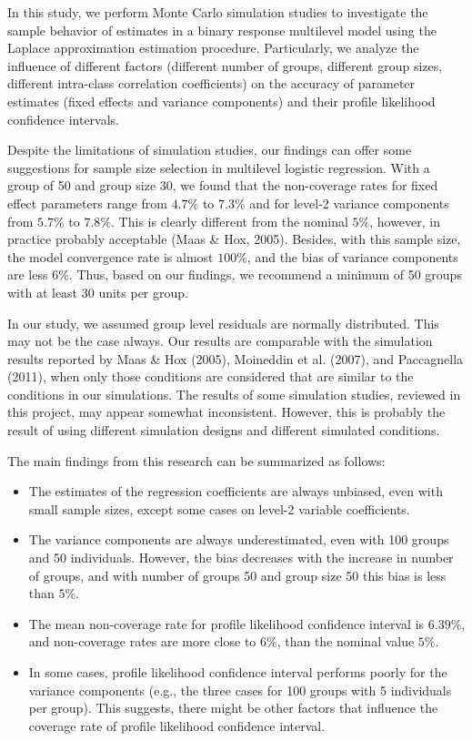 \documentclass[12pt,oneside,a4paper]{reedthesis}
\begin{document}
In this study, we perform Monte Carlo simulation studies to investigate the sample behavior of estimates in a binary response multilevel model using the Laplace approximation estimation procedure. Particularly, we analyze the influence of different factors (different number of groups, different group sizes, different intra-class correlation coefficients) on the accuracy of parameter estimates (fixed effects and variance components) and their profile likelihood confidence intervals.

Despite the limitations of simulation studies, our findings can offer some suggestions for sample size selection in multilevel logistic regression. With a group of 50 and group size 30, we found that the non-coverage rates for fixed effect parameters range from \(4.7\%\) to \(7.3\%\) and for level-2 variance components from \(5.7\%\) to \(7.8\%\). This is clearly different from the nominal \(5\%\), however, in practice probably acceptable (Maas \& Hox, 2005). Besides, with this sample size, the model convergence rate is almost \(100\%\), and the bias of variance components are less \(6\%\). Thus, based on our findings, we recommend a minimum of 50 groups with at least 30 units per group.

In our study, we assumed group level residuals are normally distributed. This may not be the case always. Our results are comparable with the simulation results reported by Maas \& Hox (2005), Moineddin et al. (2007), and Paccagnella (2011), when only those conditions are considered that are similar to the conditions in our simulations.
The results of some simulation studies, reviewed in this project, may appear somewhat inconsistent. However, this is probably the result of using different simulation designs and different simulated conditions.

The main findings from this research can be summarized as follows:
\begin{itemize}
\item
  The estimates of the regression coefficients are always unbiased, even with small sample sizes, except some cases on level-2 variable coefficients.
\item
  The variance components are always underestimated, even with 100 groups and 50 individuals. However, the bias decreases with the increase in number of groups, and with number of groups 50 and group size 50 this bias is less than \(5\%\).
\item
  The mean non-coverage rate for profile likelihood confidence interval is \(6.39\%\), and non-coverage rates are more close to \(6\%\), than the nominal value \(5\%\).
\item
  In some cases, profile likelihood confidence interval performs poorly for the variance components (e.g., the three cases for 100 groups with 5 individuals per group). This suggests, there might be other factors that influence the coverage rate of profile likelihood confidence interval.
\end{itemize}
\appendix
\end{document}

